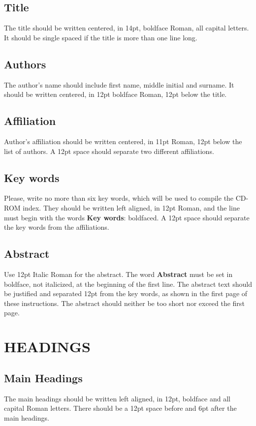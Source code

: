 \documentclass{CFD2010paper}
\begin{document}
\subsection{Title}
The title should be written centered, in 14pt, boldface Roman, all capital letters. It should be single spaced if the title is more than one line long.

\subsection{Authors}
The author's name should include first name, middle initial and surname. It should be written centered, in 12pt boldface Roman, 12pt below the title.

\subsection{Affiliation}
Author's affiliation should be written centered, in 11pt Roman, 12pt below the list of authors. A 12pt space should separate two different affiliations.

\subsection{Key words}
Please, write no more than six key words, which will be used to compile the CD-ROM index. They should be written left aligned, in 12pt Roman, and the line must begin with the words {\bf Key words}: boldfaced. A 12pt space should separate the key words from the affiliations.

\subsection{Abstract}
Use 12pt Italic Roman for the abstract. The word {\bf Abstract} must be set in boldface, not italicized, at the beginning of the first line. The abstract text should be justified and separated 12pt from the key words, as shown in the first page of these instructions. The abstract should neither be too short nor exceed the first page.

\section{HEADINGS}
\subsection{Main Headings}
The main headings should be written left aligned, in 12pt, boldface and all capital Roman letters. There should be a 12pt space before and 6pt after the main headings.
\end{document}
